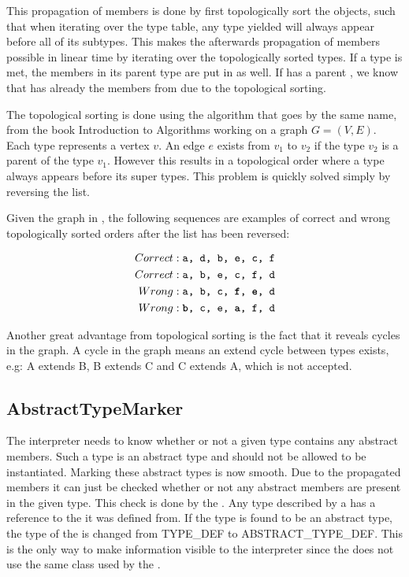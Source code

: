 This propagation of members is done by first topologically sort the
 objects, such that when iterating over the type table,
any type yielded will always appear before all of its subtypes. This makes the
afterwards propagation of members possible in linear time by iterating over the
topologically sorted types. If a type  is met, the members in its parent
type  are put in  as well. If  has a parent , we
know that  has already the members from  due to the topological
sorting.

The topological sorting is done using the algorithm that goes by the same name,
from the book Introduction to Algorithms\cite[p. 612]{ad} working on a graph $G
= (V, E)$. Each type represents a vertex $v$. An edge $e$ exists from $v_1$ to
$v_2$ if the type $v_2$ is a parent of the type $v_1$. However this results in a
topological order where a type always appears before its super types. This
problem is quickly solved simply by reversing the list.

Given the graph in , the following sequences are examples
of correct and wrong topologically sorted orders after the list has been reversed:

\begin{align*}
 Correct &: \texttt{a, d, b, e, c, f} \\
 Correct &: \texttt{a, b, e, c, f, d} \\
 Wrong &: \texttt{a, b, c, \textbf{f}, \textbf{e}, d} \\
 Wrong &: \texttt{\textbf{b}, c, e, \textbf{a}, f, d}
\end{align*}



Another great advantage from topological sorting is the fact that it reveals
cycles in the graph. A cycle in the graph means an extend cycle between types
exists, e.g: A extends B, B extends C and C extends A, which is not accepted.

\subsection{AbstractTypeMarker}
\label{sec:abstractTypeMarker}
The interpreter needs to know whether or not a given type contains any abstract
members. Such a type is an abstract type and should not be allowed to be
instantiated. Marking these abstract types is now smooth. Due to the propagated
members it can just be checked whether or not any abstract members are present in the
given type. This check is done by the . Any type
described by a  has a reference to the
 it was defined from. If the type is found to be an abstract
type, the type of the  is changed from TYPE\_DEF to
ABSTRACT\_TYPE\_DEF. This is the only way to make information visible to the
interpreter since the  does not use the same
 class used by the .

